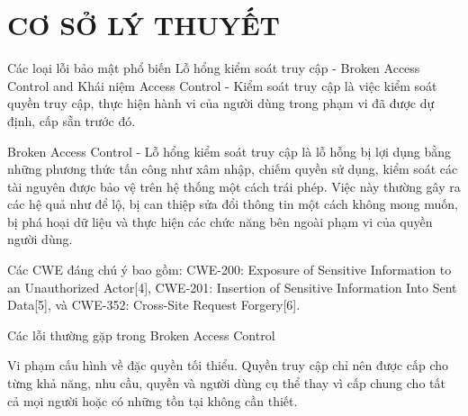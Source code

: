 \chapter{CƠ SỞ LÝ THUYẾT}
Các loại lỗi bảo mật phổ biến
Lỗ hổng kiểm soát truy cập - Broken Access Control \cite{basar1995dynamic} and \cite{basar199mic}
Khái niệm
Access Control - Kiểm soát truy cập là việc kiểm soát quyền truy cập, thực hiện hành vi của người dùng trong phạm vi đã được dự định, cấp sẵn trước đó.

Broken Access Control - Lỗ hổng kiểm soát truy cập là lỗ hỗng bị lợi dụng bằng những phương thức tấn công như xâm nhập, chiếm quyền sử dụng, kiểm soát các tài nguyên được bảo vệ trên hệ thống một cách trái phép. Việc này thường gây ra các hệ quả như để lộ, bị can thiệp sửa đổi thông tin một cách không mong muốn, bị phá hoại dữ liệu và thực hiện các chức năng bên ngoài phạm vi của quyền người dùng.

Các CWE đáng chú ý bao gồm: CWE-200: Exposure of Sensitive Information to an Unauthorized Actor[4], CWE-201: Insertion of Sensitive Information Into Sent Data[5], và CWE-352: Cross-Site Request Forgery[6].

Các lỗi thường gặp trong Broken Access Control

Vi phạm cấu hình về đặc quyền tối thiểu. Quyền truy cập chỉ nên được cấp cho từng khả năng, nhu cầu, quyền và người dùng cụ thể thay vì cấp chung cho tất cả mọi người hoặc có những tồn tại không cần thiết.




